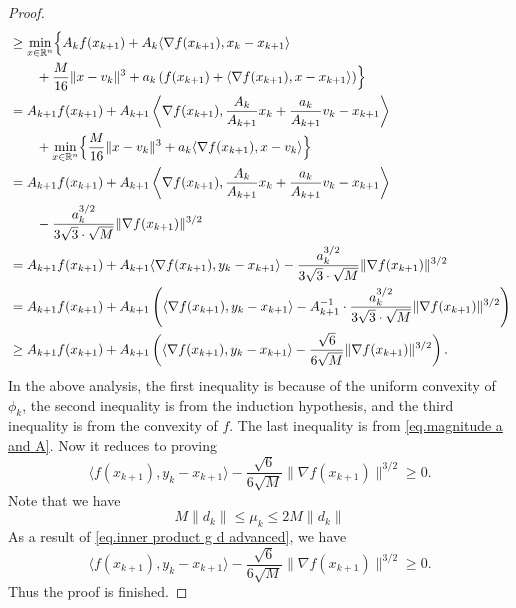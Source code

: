 \documentclass{mcom-l}
\numberwithin{equation}{section}
\begin{document}
\begin{proof}
\begin{align*}
         & \geq \min_{x\in\mathbb{R}^n} \Bigl\{ A_k f(x_{k+1}) + A_k \langle \nabla f(x_{k+1}), x_k - x_{k+1} \rangle                           \\
         & \qquad + \frac{M}{16} \|x - v_k\|^3 + a_k \left(f(x_{k+1}) + \langle \nabla f(x_{k+1}), x - x_{k+1} \rangle \right) \Bigr\}          \\
         & =  A_{k+1} f(x_{k+1})
        + A_{k+1} \left\langle \nabla f(x_{k+1}),
        \frac{A_k}{A_{k+1}} x_k + \frac{a_k}{A_{k+1}} v_k - x_{k+1} \right\rangle                                                               \\
         & \qquad + \min_{x\in\mathbb{R}^n} \Bigl\{\frac{M}{16} \|x - v_k\|^3
        + a_k \langle \nabla f(x_{k+1}), x - v_k \rangle \Bigr\}                                                                                \\
         & = A_{k+1} f(x_{k+1})
        + A_{k+1} \left\langle \nabla f(x_{k+1}),
        \frac{A_k}{A_{k+1}} x_k + \frac{a_k}{A_{k+1}} v_k - x_{k+1} \right\rangle                                                               \\
         & \qquad - \frac{a_k^{3/2}}{3\sqrt{3} \cdot \sqrt{M}} \|\nabla f(x_{k+1})\|^{3/2}                                                      \\
         & = A_{k+1} f(x_{k+1}) + A_{k+1} \langle \nabla f(x_{k+1}), y_k - x_{k+1} \rangle
        - \frac{a_k^{3/2}}{3\sqrt{3} \cdot \sqrt{M}} \|\nabla f(x_{k+1})\|^{3/2}                                                                \\
         & = A_{k+1} f(x_{k+1}) + A_{k+1} \left(
        \langle \nabla f(x_{k+1}), y_k - x_{k+1} \rangle
        - A_{k+1}^{-1} \cdot \frac{a_k^{3/2}}{3\sqrt{3} \cdot \sqrt{M}}
        \|\nabla f(x_{k+1})\|^{3/2} \right)                                                                                                     \\
         & \geq A_{k+1} f(x_{k+1}) + A_{k+1} \left(
        \langle \nabla f(x_{k+1}), y_k - x_{k+1} \rangle
        - \frac{\sqrt{6}}{6\sqrt{M}} \|\nabla f(x_{k+1})\|^{3/2} \right).
    \end{align*}
    In the above analysis, the first inequality is because of the uniform convexity of $\phi_k$, the second inequality is from the induction hypothesis, and the third inequality is from the convexity of $f$. The last inequality is from \eqref{eq.magnitude a and A}. Now it reduces to proving
    \begin{equation*}
        \langle f(x_{k+1}),y_k-x_{k+1} \rangle -\frac{\sqrt{6}}{6\sqrt{M}}\|\nabla f(x_{k+1})\|^{3/2} \geq 0.
    \end{equation*}
    Note that we have
    \begin{equation*}
        M\|d_k\| \leq \mu_k \leq 2M\|d_k\|
    \end{equation*}
    As a result of \eqref{eq.inner product g d advanced}, we have
    \begin{equation*}
        \langle f(x_{k+1}),y_k-x_{k+1} \rangle -\frac{\sqrt{6}}{6\sqrt{M}}\|\nabla f(x_{k+1})\|^{3/2} \geq 0.
    \end{equation*}
    Thus the proof is finished.
\end{proof}
\end{document}
